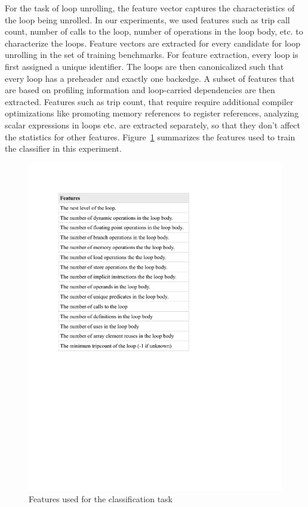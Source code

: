 \documentclass[]{sig-alternate}
\begin{document}
For the task of loop unrolling, the feature vector captures the characteristics of the loop being unrolled. In our experiments, we used features such as trip call count, number of calls to the loop, number of operations in the loop body, etc. to characterize the loops. Feature vectors are extracted for every candidate for loop unrolling in the set of training benchmarks. For feature extraction, every loop is first assigned a unique identifier. The loops are then canonicalized such that every loop has a preheader and exactly one backedge. A subset of features that are based on profiling information and loop-carried dependencies are then extracted. Features such as trip count, that require require additional compiler optimizations like promoting memory references to register references, analyzing scalar expressions in loops etc. are extracted separately, so that they don't affect the statistics for other features. Figure~\ref{fig:features} summarizes the features used to train the classifier in this experiment.

\begin{figure}
  \center
  \includegraphics[width=0.90\linewidth]{fig/features.pdf}
  \caption{Features used for the classification task}
  \label{fig:features}
\end{figure}
\end{document}
